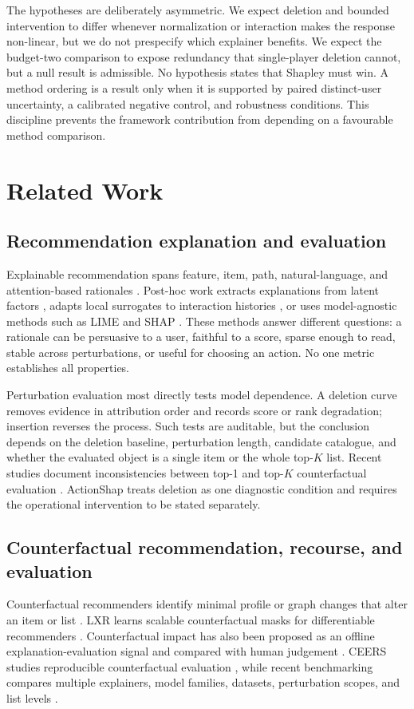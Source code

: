 \documentclass[pdflatex,sn-basic]{sn-jnl}
\begin{document}
The hypotheses are deliberately asymmetric. We expect deletion and bounded intervention to differ whenever normalization or interaction makes the response non-linear, but we do not prespecify which explainer benefits. We expect the budget-two comparison to expose redundancy that single-player deletion cannot, but a null result is admissible. No hypothesis states that Shapley must win. A method ordering is a result only when it is supported by paired distinct-user uncertainty, a calibrated negative control, and robustness conditions. This discipline prevents the framework contribution from depending on a favourable method comparison.

\section{Related Work}
\subsection{Recommendation explanation and evaluation}
Explainable recommendation spans feature, item, path, natural-language, and attention-based rationales \citep{zhang2020survey}. Post-hoc work extracts explanations from latent factors \citep{peake2018}, adapts local surrogates to interaction histories \citep{nobrega2019}, or uses model-agnostic methods such as LIME \citep{ribeiro2016} and SHAP \citep{lundberg2017}. These methods answer different questions: a rationale can be persuasive to a user, faithful to a score, sparse enough to read, stable across perturbations, or useful for choosing an action. No one metric establishes all properties.

Perturbation evaluation most directly tests model dependence. A deletion curve removes evidence in attribution order and records score or rank degradation; insertion reverses the process. Such tests are auditable, but the conclusion depends on the deletion baseline, perturbation length, candidate catalogue, and whether the evaluated object is a single item or the whole top-$K$ list. Recent studies document inconsistencies between top-1 and top-$K$ counterfactual evaluation \citep{mohammadi2025}. ActionShap treats deletion as one diagnostic condition and requires the operational intervention to be stated separately.

\subsection{Counterfactual recommendation, recourse, and evaluation}
Counterfactual recommenders identify minimal profile or graph changes that alter an item or list \citep{ghazimatin2020,tran2021,tan2021}. LXR learns scalable counterfactual masks for differentiable recommenders \citep{barkan2024,gurevitch2025}. Counterfactual impact has also been proposed as an offline explanation-evaluation signal and compared with human judgement \citep{yao2022}. CEERS studies reproducible counterfactual evaluation \citep{baklanov2024}, while recent benchmarking compares multiple explainers, model families, datasets, perturbation scopes, and list levels \citep{nguyen2026}.
\end{document}
